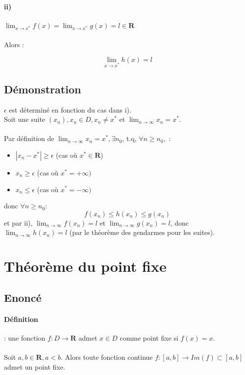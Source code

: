 \documentclass{article}
\begin{document}
\paragraph{ii)}

$ \lim_{x\to{x^*}} f(x) = \lim_{x\to{x^*}} g(x) = l \in \mathbf{R} $\\\\
Alors : 

\[ \lim_{x\to{x^*}} h(x) = l \]

\subsection{Démonstration}

$ \epsilon $ est déterminé en fonction du cas dans i).\\
Soit une suite $ (x_n), x_n \in D, x_n \neq x^* $ et $ \lim_{n\to\infty} x_n = x^* $.\\\\
Par définition de $ \lim_{n\to\infty} x_n = x^*, \exists n_0 $, t.q, $ \forall n \geq n_0, $ :
\begin{itemize}
    \item $ |x_n - x^*| \geq \epsilon $ (cas où $ x^* \in \mathbf{R} $)
    \item $ x_n \geq \epsilon $ (cas où $ x^* = +\infty)$
    \item $ x_n \leq \epsilon $ (cas où $ x^* = -\infty)$
\end{itemize}
donc $ \forall n \geq n_0 $:
\[ f(x_n) \leq h(x_n) \leq g(x_n) \]
et par ii), $ \lim_{n\to\infty} f(x_n) = l $ et $ \lim_{n\to\infty} g(x_n) = l $, donc $ \lim_{n\to\infty} h(x_n) = l $ (par le théorème des gendarmes pour les suites).

\newpage

\section{Théorème du point fixe}

\subsection{Enoncé}

\paragraph{Définition} : une fonction $ f : D \to \mathbf{R} $ admet $ x \in D $ comme point fixe si $ f(x) = x $.\\\\
Soit $ a, b \in \mathbf{R}, a < b $. Alors toute fonction continue $ f : [a, b] \to Im(f) \subset [a, b] $ admet un point fixe.\\\\
\end{document}
